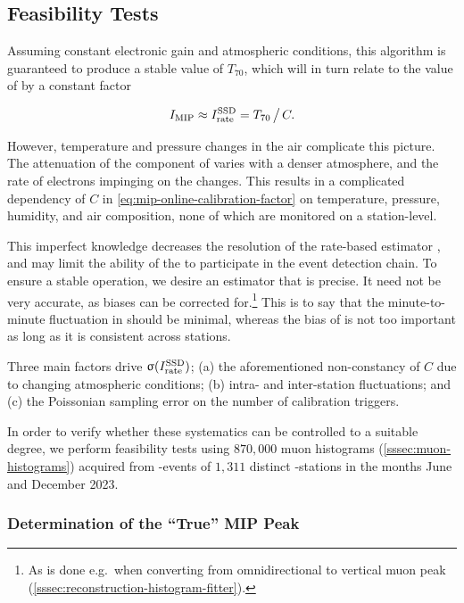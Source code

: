 \subsection{Feasibility Tests}
\label{ssec:feasibility-tests}

Assuming constant electronic gain and atmospheric conditions, this algorithm is 
guaranteed to produce a stable value of $T_{70}$, which will in turn relate
to the value of \Imip by a constant factor

\begin{equation}
\label{eq:mip-online-calibration-factor}
I_\text{MIP}\approx I^\text{SSD}_\text{rate} = T_{70}\,\big/\,C.
\end{equation}

However, temperature and pressure changes in the air complicate this picture. 
The attenuation of the \EM component of \EASs varies with a denser atmosphere, 
and the rate of electrons impinging on the \SSD changes. This results in a 
complicated dependency of $C$ in \cref{eq:mip-online-calibration-factor} on 
temperature, pressure, humidity, and air composition, none of which are 
monitored on a station-level. 

This imperfect knowledge decreases the resolution of the rate-based estimator 
\MipOnline, and may limit the ability of the \SSD to participate in the event 
detection chain. To ensure a stable operation, we desire an estimator that is 
precise. It need not be very accurate, as biases can be corrected 
for.\footnote{As is done e.g.~when converting from omnidirectional to 
vertical muon peak (\cref{sssec:reconstruction-histogram-fitter}).}
This is to say that the minute-to-minute fluctuation in \MipOnline should be 
minimal, whereas the bias of \MipOnline is not too important as long as it is 
consistent across stations.

Three main factors drive $\upsigma(I^\text{SSD}_\text{rate})$; (a) the aforementioned 
non-constancy of $C$ due to changing atmospheric conditions; (b) intra- and 
inter-station fluctuations; and (c) the Poissonian sampling error on the number 
of calibration triggers. 

In order to verify whether these systematics can be controlled to a suitable 
degree, we perform feasibility tests using $870,\!000$ \SSD muon histograms 
(\cref{sssec:muon-histograms}) acquired from \TTHREE-events of $1,\!311$ 
distinct \SD-stations in the months June and December 2023. 

\subsubsection{Determination of the ``True'' MIP Peak}

